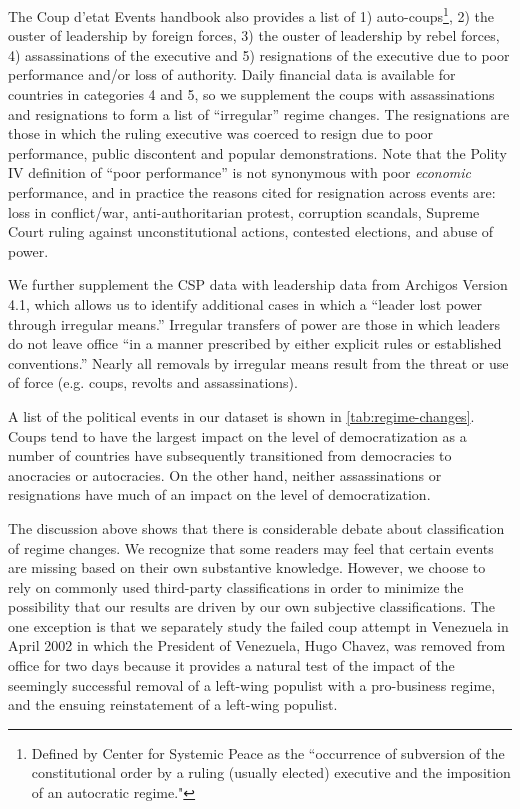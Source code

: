 \documentclass[12pt,final,fleqn]{article}
\theoremstyle{plain}
\begin{document}
The Coup d'etat Events handbook also provides a list of 1) auto-coups\footnote{Defined by Center for Systemic Peace as the ``occurrence of subversion of the constitutional order by a ruling (usually elected) executive and the imposition of an autocratic regime."}, 2) the ouster of leadership by foreign forces, 3) the ouster of leadership by rebel forces, 4) assassinations of the executive and 5) resignations of the executive due to poor performance and/or loss of authority. Daily financial data is available for countries in categories 4 and 5, so we supplement the coups with assassinations and resignations to form a list of ``irregular'' regime changes. The resignations are those in which the ruling executive was coerced to resign due to poor performance, public discontent and popular demonstrations. Note that the Polity IV definition of ``poor performance'' is not synonymous with poor \textit{economic} performance, and in practice the reasons cited for resignation across events are: loss in conflict/war, anti-authoritarian protest, corruption scandals, Supreme Court ruling against unconstitutional actions, contested elections, and abuse of power. 


We further supplement the CSP data with leadership data from Archigos Version 4.1, which allows us to identify additional cases in which a ``leader lost power through irregular means.'' Irregular transfers of power are those in which leaders do not leave office ``in a manner prescribed by either explicit rules or established conventions.'' Nearly all removals by irregular means result from the threat or use of force (e.g. coups, revolts and assassinations). 

A list of the political events in our dataset is shown in \autoref{tab:regime-changes}. Coups tend to have the largest impact on the level of democratization as a number of countries have subsequently transitioned from democracies to anocracies or autocracies. On the other hand, neither assassinations or resignations have much of an impact on the level of democratization. 

The discussion above shows that there is considerable debate about classification of regime changes. We recognize that some readers may feel that certain events are missing based on their own substantive knowledge. However, we choose to rely on commonly used third-party classifications in order to minimize the possibility that our results are driven by our own subjective classifications. The one exception is that we separately study the failed coup attempt in Venezuela in April 2002 in which the President of Venezuela, Hugo Chavez, was removed from office for two days because it provides a natural test of the impact of the seemingly successful removal of a left-wing populist with a pro-business regime, and the ensuing reinstatement of a left-wing populist. 
\end{document}
